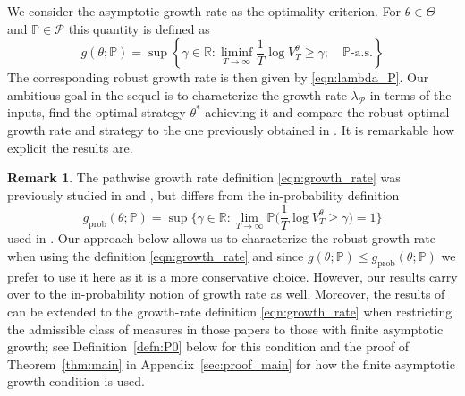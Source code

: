 \documentclass{article}
\theoremstyle{plain}
\theoremstyle{definition}
\newtheorem{remark}[lem]{Remark}
\newcommand{\R}{\mathbb{R}}
\renewcommand{\P}{\mathbb{P}}
\newcommand{\Pcal}{{\mathcal P}}
\numberwithin{lem}{section}
\begin{document}
We consider the asymptotic growth rate as the optimality criterion. For $\theta \in \Theta$ and $\P \in \Pcal$ this quantity is defined as 
\begin{equation}\label{eqn:growth_rate}
    g(\theta;\P) = \sup\left\{\gamma \in \R: \liminf_{T \to \infty} \frac{1}{T}\log V_T^\theta \geq \gamma; \quad \P\text{-a.s.}\right\}
\end{equation}
The corresponding robust growth rate is then given by \eqref{eqn:lambda_P}.
Our ambitious goal in the sequel is to characterize the growth rate $\lambda_\Pcal$ in terms of the inputs, find the optimal strategy $\theta^*$ achieving it and compare the robust optimal growth rate and strategy to the one previously obtained in \cite{itkin2025ergodic}. It is remarkable how explicit the results are.

\begin{remark} \label{rem:growth_rate}
The pathwise growth rate definition \eqref{eqn:growth_rate} was previously studied in  \cite{kardrarasrobust2012} and \cite[Section~2.3.7]{karatzas2021portfolio}, but differs from the in-probability definition
\begin{equation} \label{eqn:growth_rate_prob}
g_{\mathrm{prob}}(\theta;\P) = \sup\Big\{\gamma \in \R: \lim_{T \to \infty} \P\Big(\frac{1}{T}\log V_T^\theta \geq \gamma\Big) = 1\Big\}
\end{equation}
used in \cite{kardaras2021ergodic,itkin2025ergodic}. Our approach below allows us to characterize the robust growth rate when using the definition \eqref{eqn:growth_rate} and since $g(\theta;\P) \leq g_{\mathrm{prob}}(\theta;\P)$ we prefer to use it here as it is a more conservative choice. However, our results carry over to the in-probability notion of growth rate as well. Moreover, the results of \cite{kardaras2021ergodic,itkin2025ergodic} can be extended to the growth-rate definition \eqref{eqn:growth_rate} when restricting the admissible class of measures in those papers to those with finite asymptotic growth; see Definition~\ref{defn:P0} below for this condition and the proof of Theorem~\ref{thm:main} in Appendix~\ref{sec:proof_main} for how the finite asymptotic growth condition is used.
\end{remark}
\end{document}
